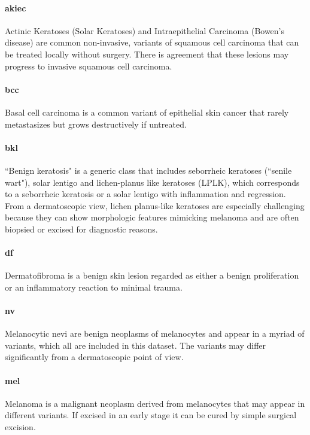 	\paragraph{akiec}
	Actinic Keratoses (Solar Keratoses) and Intraepithelial Carcinoma (Bowen’s disease) are common non-invasive, variants of squamous cell carcinoma that can be treated locally without surgery. There is agreement that these lesions may progress to invasive squamous cell carcinoma. 
	
	\paragraph{bcc}
	Basal cell carcinoma is a common variant of epithelial skin cancer that rarely metastasizes but grows destructively if untreated. 
	
	\paragraph{bkl}
	``Benign keratosis" is a generic class that includes seborrheic keratoses (``senile wart"), solar lentigo and lichen-planus like keratoses (LPLK), which corresponds to a seborrheic keratosis or a solar lentigo with inflammation and regression. From a dermatoscopic view, lichen planus-like keratoses are especially challenging because they can show morphologic features mimicking melanoma and are often biopsied or excised for diagnostic reasons. 
	
	\paragraph{df}
	Dermatofibroma is a benign skin lesion regarded as either a benign proliferation or an inflammatory reaction to minimal trauma. 
	
	\paragraph{nv}
	Melanocytic nevi are benign neoplasms of melanocytes and appear in a myriad of variants, which all are included in this dataset. The variants may differ significantly from a dermatoscopic point of view.
	
	\paragraph{mel}
	Melanoma is a malignant neoplasm derived from melanocytes that may appear in different variants. If excised in an early stage it can be cured by simple surgical excision. 
	
